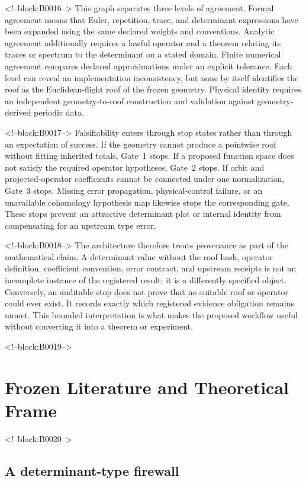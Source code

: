 \documentclass[11pt,a4paper]{article}
\begin{document}
<!--block:B0016-->
This graph separates three levels of agreement. Formal agreement means that Euler, repetition, trace, and determinant expressions have been expanded using the same declared weights and conventions. Analytic agreement additionally requires a lawful operator and a theorem relating its traces or spectrum to the determinant on a stated domain. Finite numerical agreement compares declared approximations under an explicit tolerance. Each level can reveal an implementation inconsistency, but none by itself identifies the roof as the Euclidean-flight roof of the frozen geometry. Physical identity requires an independent geometry-to-roof construction and validation against geometry-derived periodic data.

<!--block:B0017-->
Falsifiability enters through stop states rather than through an expectation of success. If the geometry cannot produce a pointwise roof without fitting inherited totals, Gate~1 stops. If a proposed function space does not satisfy the required operator hypotheses, Gate~2 stops. If orbit and projected-operator coefficients cannot be connected under one normalization, Gate~3 stops. Missing error propagation, physical-control failure, or an unavailable cohomology hypothesis map likewise stops the corresponding gate. These stops prevent an attractive determinant plot or internal identity from compensating for an upstream type error.

<!--block:B0018-->
The architecture therefore treats provenance as part of the mathematical claim. A determinant value without the roof hash, operator definition, coefficient convention, error contract, and upstream receipts is not an incomplete instance of the registered result; it is a differently specified object. Conversely, an auditable stop does not prove that no suitable roof or operator could ever exist. It records exactly which registered evidence obligation remains unmet. This bounded interpretation is what makes the proposed workflow useful without converting it into a theorem or experiment.

<!--block:B0019-->
\section{Frozen Literature and Theoretical Frame}

<!--block:B0020-->
\subsection{A determinant-type firewall}
\end{document}
